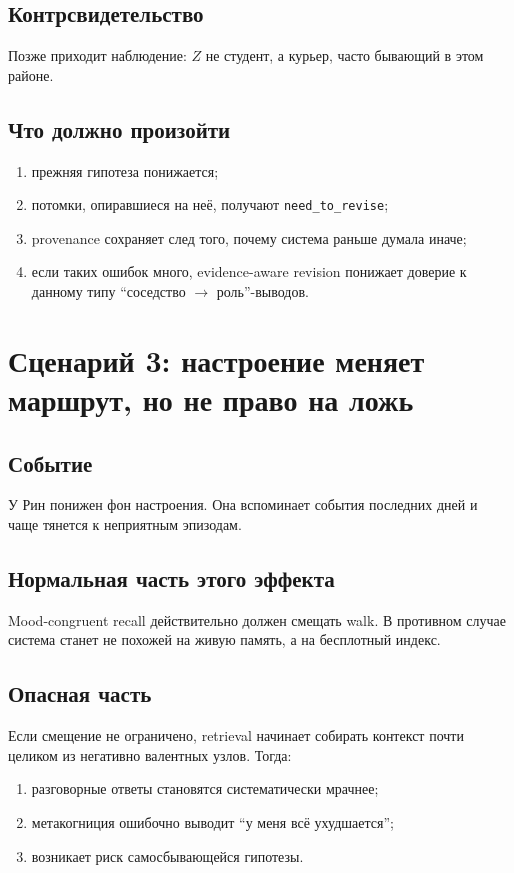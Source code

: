 \subsection*{Контрсвидетельство}
Позже приходит наблюдение: $Z$ не студент, а курьер, часто бывающий в этом районе.

\subsection*{Что должно произойти}
\begin{enumerate}
\item прежняя гипотеза понижается;
\item потомки, опиравшиеся на неё, получают \texttt{need\_to\_revise};
\item provenance сохраняет след того, почему система раньше думала иначе;
\item если таких ошибок много, evidence-aware revision понижает доверие к данному
типу ``соседство $\to$ роль''-выводов.
\end{enumerate}

\section{Сценарий 3: настроение меняет маршрут, но не право на ложь}

\subsection*{Событие}
У Рин понижен фон настроения. Она вспоминает события последних дней и чаще тянется
к неприятным эпизодам.

\subsection*{Нормальная часть этого эффекта}
Mood-congruent recall действительно должен смещать walk. В противном случае система
станет не похожей на живую память, а на бесплотный индекс.

\subsection*{Опасная часть}
Если смещение не ограничено, retrieval начинает собирать контекст почти целиком из
негативно валентных узлов. Тогда:
\begin{enumerate}
\item разговорные ответы становятся систематически мрачнее;
\item метакогниция ошибочно выводит ``у меня всё ухудшается'';
\item возникает риск самосбывающейся гипотезы.
\end{enumerate}

